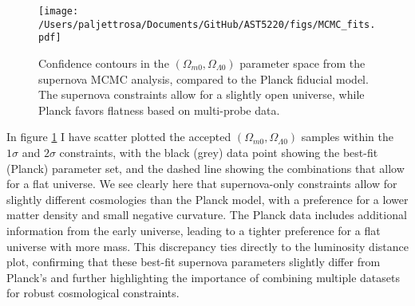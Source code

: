 \documentclass{aa}
\numberwithin{equation}{section}
\numberwithin{table}{section}
\numberwithin{figure}{section}
\begin{document}
\begin{figure}
    \centering
    \texttt{[image: /Users/paljettrosa/Documents/GitHub/AST5220/figs/MCMC\_fits.pdf]}
    \caption{Confidence contours in the $(\Omega_{m0},\Omega_{\Lambda0})$ parameter space from the supernova MCMC analysis, compared to the Planck fiducial model. The supernova constraints allow for a slightly open universe, while Planck favors flatness based on multi-probe data.}\label{fig:MCMC fits}
\end{figure}

In figure \ref{fig:MCMC fits} I have scatter plotted the accepted $(\Omega_{m0},\Omega_{\Lambda0})$ samples within the $1\sigma$ and $2\sigma$ constraints, with the black (grey) data point showing the best-fit (Planck) parameter set, and the dashed line showing the combinations that allow for a flat universe. We see clearly here that supernova-only constraints allow for slightly different cosmologies than the Planck model, with a preference for a lower matter density and small negative curvature. The Planck data includes additional information from the early universe, leading to a tighter preference for a flat universe with more mass. This discrepancy ties directly to the luminosity distance plot, confirming that these best-fit supernova parameters slightly differ from Planck's and further highlighting the importance of combining multiple datasets for robust cosmological constraints.


\end{document}
